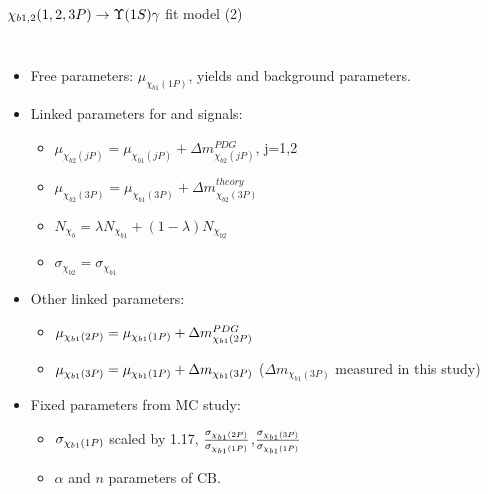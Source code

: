 \begin{frame}{$\chi_{b1,2}(1,2,3P) \to \OneS \gamma$ fit model (2)}
\begin{columns}[T]
\begin{itemize}
\item Free parameters: $\mu_{\chi_{b1}(1P)}$, yields and background parameters.
\item Linked parameters for \chibone and \chibtwo signals:
    \begin{itemize}
    \item $\mu_{\chi_{b2}(jP)} = \mu_{\chi_{b1}(jP)} + \Delta m_{\chi_{b2}(jP)}^{PDG}$, j=1,2
    \item $\mu_{\chi_{b2}(3P)} = \mu_{\chi_{b1}(3P)} + \Delta m_{\chi_{b2}(3P)}^{theory}$
    \item $N_{\chi_{b}} = \lambda N_{\chi_{b1}} + (1-\lambda) N_{\chi_{b2}}$
    \item $\sigma_{\chi_{b2}} = \sigma_{\chi_{b1}}$
    \end{itemize}
\item Other linked parameters:    
    \begin{itemize}
        \item $\mu_{\chi_{b 1}(2P)} = \mu_{\chi_{b 1}(1P)} + \Delta m_{\chi_{b1}(2P)}^{PDG}$
        \item $\mu_{\chi_{b 1}(3P)} = \mu_{\chi_{b 1}(1P)} + \Delta m_{\chi_{b1}(3P)}$ ($\Delta m_{\chi_{b1}(3P)}$ measured in this study)
    \end{itemize}
\item Fixed parameters from MC study:
    \begin{itemize}
    \item $\sigma_{\chi_{b 1}(1P)}$ \scriptsize{scaled by 1.17}, $\frac{\sigma_{\chi_{b 1}(2P)}}{\sigma_{\chi_{b 1}(1P)}}$,$\frac{\sigma_{\chi_{b 1}(3P)}}{\sigma_{\chi_{b 1}(1P)}}$
    \item $\alpha$ and $n$ parameters of CB.
    \end{itemize}
\end{itemize}

\bigskip

\end{columns}


\end{frame}
